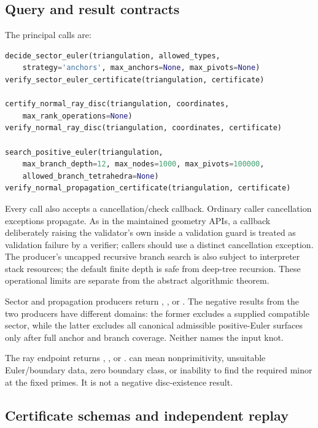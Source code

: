 \subsection{Query and result contracts}

The principal calls are:
\begin{lstlisting}[language=Python]
decide_sector_euler(triangulation, allowed_types,
    strategy='anchors', max_anchors=None, max_pivots=None)
verify_sector_euler_certificate(triangulation, certificate)

certify_normal_ray_disc(triangulation, coordinates,
    max_rank_operations=None)
verify_normal_ray_disc(triangulation, coordinates, certificate)

search_positive_euler(triangulation,
    max_branch_depth=12, max_nodes=1000, max_pivots=100000,
    allowed_branch_tetrahedra=None)
verify_normal_propagation_certificate(triangulation, certificate)
\end{lstlisting}
Every call also accepts a cancellation/check callback. Ordinary caller cancellation exceptions propagate. As in the maintained geometry APIs, a callback deliberately raising the validator's own  inside a validation guard is treated as validation failure by a verifier; callers should use a distinct cancellation exception. The producer's uncapped recursive branch search is also subject to interpreter stack resources; the default finite depth is safe from deep-tree recursion. These operational limits are separate from the abstract algorithmic theorem.

Sector and propagation producers return , , or . The negative results from the two producers have different domains: the former excludes a supplied compatible sector, while the latter excludes all canonical admissible positive-Euler surfaces only after full anchor and branch coverage. Neither names the input knot.

The ray endpoint returns , , or .  can mean nonprimitivity, unsuitable Euler/boundary data, zero boundary class, or inability to find the required minor at the fixed primes. It is not a negative disc-existence result.

\subsection{Certificate schemas and independent replay}


